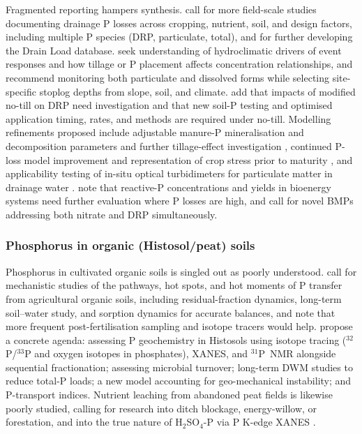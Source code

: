 \documentclass[11pt]{article}
\begin{document}
Fragmented reporting hampers synthesis. \textcite{Christianson2016} call for more field-scale studies documenting drainage P losses across cropping, nutrient, soil, and design factors, including multiple P species (DRP, particulate, total), and for further developing the Drain Load database. \textcite{Macrae2019} seek understanding of hydroclimatic drivers of event responses and how tillage or P placement affects concentration relationships, and \textcite{Tanga2025} recommend monitoring both particulate and dissolved forms while selecting site-specific stoplog depths from slope, soil, and climate. \textcite{Zhang2017} add that impacts of modified no-till on DRP need investigation and that new soil-P testing and optimised application timing, rates, and methods are required under no-till. Modelling refinements proposed include adjustable manure-P mineralisation and decomposition parameters and further tillage-effect investigation \parencite{Pan2023}, continued P-loss model improvement and representation of crop stress prior to maturity \parencite{Wang2019}, and applicability testing of in-situ optical turbidimeters for particulate matter in drainage water \parencite{Grant1996}. \textcite{Daigh2015b} note that reactive-P concentrations and yields in bioenergy systems need further evaluation where P losses are high, and \textcite{Spiese2023} call for novel BMPs addressing both nitrate and DRP simultaneously.

\subsubsection{Phosphorus in organic (Histosol/peat) soils}

Phosphorus in cultivated organic soils is singled out as poorly understood. \textcite{Grenon2022} call for mechanistic studies of the pathways, hot spots, and hot moments of P transfer from agricultural organic soils, including residual-fraction dynamics, long-term soil--water study, and sorption dynamics for accurate balances, and note that more frequent post-fertilisation sampling and isotope tracers would help. \textcite{Grenon2021} propose a concrete agenda: assessing P geochemistry in Histosols using isotope tracing ($^{32}$P/$^{33}$P and oxygen isotopes in phosphates), XANES, and $^{31}$P~NMR alongside sequential fractionation; assessing microbial turnover; long-term DWM studies to reduce total-P loads; a new model accounting for geo-mechanical instability; and P-transport indices. Nutrient leaching from abandoned peat fields is likewise poorly studied, calling for research into ditch blockage, energy-willow, or forestation, and into the true nature of H$_2$SO$_4$-P via P K-edge XANES \parencite{Höyhtyä2025}.
\end{document}
